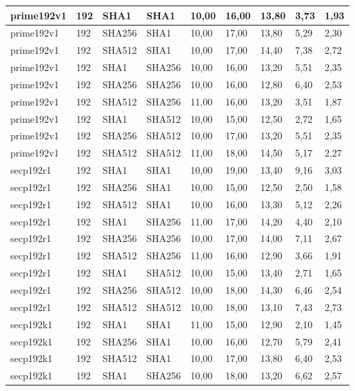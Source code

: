 \begin{longtable}{| l | l | l | l | l |l |l |l |l |}
prime192v1 & 192 & SHA1 & SHA1 & 10,00 & 16,00 & 13,80 & 3,73 & 1,93 \\ \hline 
prime192v1 & 192 & SHA256 & SHA1 & 10,00 & 17,00 & 13,80 & 5,29 & 2,30 \\ \hline 
prime192v1 & 192 & SHA512 & SHA1 & 10,00 & 17,00 & 14,40 & 7,38 & 2,72 \\ \hline 
prime192v1 & 192 & SHA1 & SHA256 & 10,00 & 16,00 & 13,20 & 5,51 & 2,35 \\ \hline 
prime192v1 & 192 & SHA256 & SHA256 & 10,00 & 16,00 & 12,80 & 6,40 & 2,53 \\ \hline 
prime192v1 & 192 & SHA512 & SHA256 & 11,00 & 16,00 & 13,20 & 3,51 & 1,87 \\ \hline 
prime192v1 & 192 & SHA1 & SHA512 & 10,00 & 15,00 & 12,50 & 2,72 & 1,65 \\ \hline 
prime192v1 & 192 & SHA256 & SHA512 & 10,00 & 17,00 & 13,20 & 5,51 & 2,35 \\ \hline 
prime192v1 & 192 & SHA512 & SHA512 & 11,00 & 18,00 & 14,50 & 5,17 & 2,27 \\ \hline 
secp192r1 & 192 & SHA1 & SHA1 & 10,00 & 19,00 & 13,40 & 9,16 & 3,03 \\ \hline 
secp192r1 & 192 & SHA256 & SHA1 & 10,00 & 15,00 & 12,50 & 2,50 & 1,58 \\ \hline 
secp192r1 & 192 & SHA512 & SHA1 & 10,00 & 16,00 & 13,30 & 5,12 & 2,26 \\ \hline 
secp192r1 & 192 & SHA1 & SHA256 & 11,00 & 17,00 & 14,20 & 4,40 & 2,10 \\ \hline 
secp192r1 & 192 & SHA256 & SHA256 & 10,00 & 17,00 & 14,00 & 7,11 & 2,67 \\ \hline 
secp192r1 & 192 & SHA512 & SHA256 & 11,00 & 16,00 & 12,90 & 3,66 & 1,91 \\ \hline 
secp192r1 & 192 & SHA1 & SHA512 & 10,00 & 15,00 & 13,40 & 2,71 & 1,65 \\ \hline 
secp192r1 & 192 & SHA256 & SHA512 & 10,00 & 18,00 & 14,30 & 6,46 & 2,54 \\ \hline 
secp192r1 & 192 & SHA512 & SHA512 & 10,00 & 18,00 & 13,10 & 7,43 & 2,73 \\ \hline 
secp192k1 & 192 & SHA1 & SHA1 & 11,00 & 15,00 & 12,90 & 2,10 & 1,45 \\ \hline 
secp192k1 & 192 & SHA256 & SHA1 & 10,00 & 16,00 & 12,70 & 5,79 & 2,41 \\ \hline 
secp192k1 & 192 & SHA512 & SHA1 & 10,00 & 17,00 & 13,80 & 6,40 & 2,53 \\ \hline 
secp192k1 & 192 & SHA1 & SHA256 & 10,00 & 18,00 & 13,20 & 6,62 & 2,57 \\ \hline 

\end{longtable}
